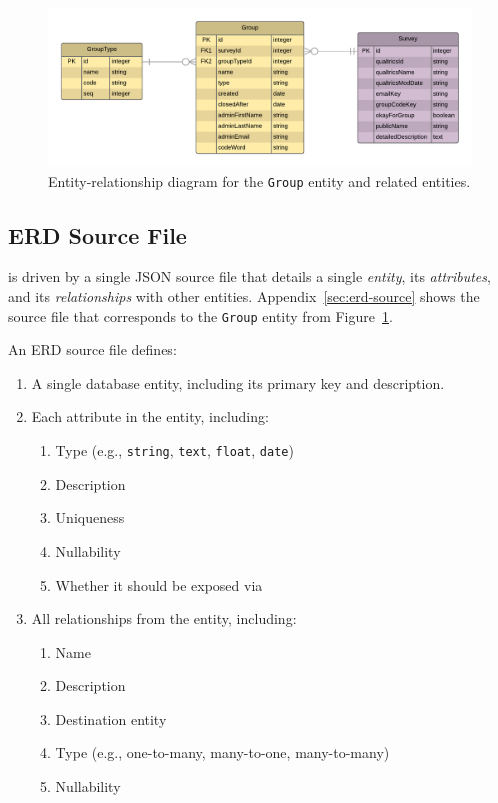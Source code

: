 \documentclass{article}
\begin{document}
\begin{figure}
  \centering
  \includegraphics[width=\textwidth]{sample-erd}
  \caption{Entity-relationship diagram
    for the \texttt{Group}
    entity and related entities.}
  \label{fig:erd}
\end{figure}

\subsection{ERD Source File}
\label{sec:erd-source-file}

\boil{} is driven by a single JSON source file
that details a single \emph{entity},
its \emph{attributes}, and its \emph{relationships} with other entities.
Appendix~\ref{sec:erd-source}
shows the source file that corresponds to
the \texttt{Group} entity
from Figure~\ref{fig:erd}.

An ERD source file defines:
\begin{enumerate}
\item A single database entity, including its primary key and description.
\item Each attribute in the entity, including:
  \begin{enumerate}
  \item Type (e.g., \texttt{string}, \texttt{text},
    \texttt{float}, \texttt{date})
  \item Description
  \item Uniqueness
  \item Nullability
  \item Whether it should be exposed via \gql
\end{enumerate}
\item All relationships from the entity, including:
  \begin{enumerate}
  \item Name
  \item Description
  \item Destination entity
  \item Type (e.g., one-to-many, many-to-one, many-to-many)
  \item Nullability
  \end{enumerate}
\end{enumerate}
\end{document}
